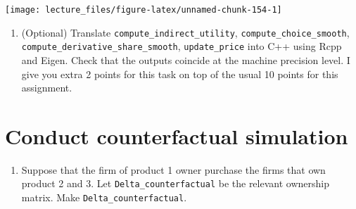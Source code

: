 \documentclass[
]{book}
\newenvironment{Shaded}{\begin{snugshade}}{\end{snugshade}}
\newcommand{\CommentTok}[1]{\textcolor[rgb]{0.56,0.35,0.01}{\textit{#1}}}
\newcommand{\DataTypeTok}[1]{\textcolor[rgb]{0.13,0.29,0.53}{#1}}
\newcommand{\DecValTok}[1]{\textcolor[rgb]{0.00,0.00,0.81}{#1}}
\newcommand{\KeywordTok}[1]{\textcolor[rgb]{0.13,0.29,0.53}{\textbf{#1}}}
\newcommand{\NormalTok}[1]{#1}
\newcommand{\OperatorTok}[1]{\textcolor[rgb]{0.81,0.36,0.00}{\textbf{#1}}}
\newcommand{\StringTok}[1]{\textcolor[rgb]{0.31,0.60,0.02}{#1}}
\providecommand{\tightlist}{%
  \setlength{\itemsep}{0pt}\setlength{\parskip}{0pt}}
\begin{document}
\begin{Shaded}
\end{Shaded}

\begin{center}\texttt{[image: lecture\_files/figure-latex/unnamed-chunk-154-1]} \end{center}

\begin{enumerate}
\def\labelenumi{\arabic{enumi}.}
\setcounter{enumi}{1}
\tightlist
\item
  (Optional) Translate \texttt{compute\_indirect\_utility}, \texttt{compute\_choice\_smooth}, \texttt{compute\_derivative\_share\_smooth}, \texttt{update\_price} into C++ using Rcpp and Eigen. Check that the outputs coincide at the machine precision level. I give you extra 2 points for this task on top of the usual 10 points for this assignment.
\end{enumerate}

\hypertarget{conduct-counterfactual-simulation}{%
\section{Conduct counterfactual simulation}\label{conduct-counterfactual-simulation}}

\begin{enumerate}
\def\labelenumi{\arabic{enumi}.}
\tightlist
\item
  Suppose that the firm of product 1 owner purchase the firms that own product 2 and 3. Let \texttt{Delta\_counterfactual} be the relevant ownership matrix. Make \texttt{Delta\_counterfactual}.
\end{enumerate}
\end{document}

